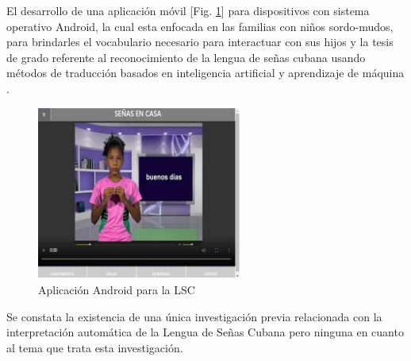  El desarrollo de una aplicación móvil [Fig. \ref{fig:app_cubana}] para dispositivos con sistema operativo Android, la cual esta enfocada en las familias con niños sordo-mudos, para brindarles el vocabulario necesario para interactuar con sus hijos  y la tesis de grado referente al reconocimiento de la lengua de señas cubana usando métodos de traducción basados en inteligencia artificial y aprendizaje de máquina .

\begin{figure}[ht!]
    \centering
    \includegraphics[width=0.6\textwidth]{Graphics/app_cubana.png}
    \caption{ Aplicación Android para la LSC }
    \label{fig:app_cubana}
\end{figure}

Se constata la existencia de una única investigación previa relacionada con la interpretación automática de la Lengua de Señas Cubana  pero ninguna en cuanto al tema que trata esta investigación.